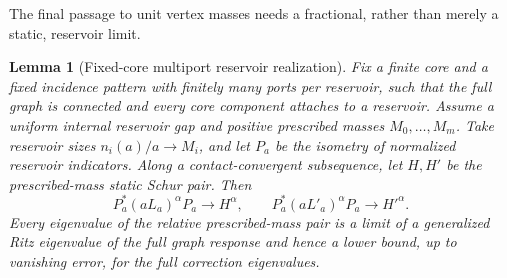 \documentclass[11pt]{article}
\newtheorem{lemma}[theorem]{Lemma}
\begin{document}
The final passage to unit vertex masses needs a fractional, rather
than merely a static, reservoir limit.
\begin{lemma}[Fixed-core multiport reservoir realization]\label{lem:reservoir}
Fix a finite core and a fixed incidence pattern with finitely many
ports per reservoir, such that the full graph is connected and every
core component attaches to a reservoir. Assume a uniform internal
reservoir gap and positive prescribed masses $M_0,\ldots,M_m$.
Take reservoir sizes $n_i(a)/a\to M_i$, and let $P_a$ be the isometry
of normalized reservoir indicators. Along a contact-convergent
subsequence, let $H,H'$ be the prescribed-mass static Schur pair. Then
\[
 P_a^*(aL_a)^\alpha P_a\longrightarrow H^\alpha,\qquad
 P_a^*(aL'_a)^\alpha P_a\longrightarrow {H'}^\alpha.
\]
Every eigenvalue of the relative prescribed-mass pair is a limit of a
generalized Ritz eigenvalue of the full graph response and hence a
lower bound, up to vanishing error, for the full correction eigenvalues.
\end{lemma}
\end{document}
